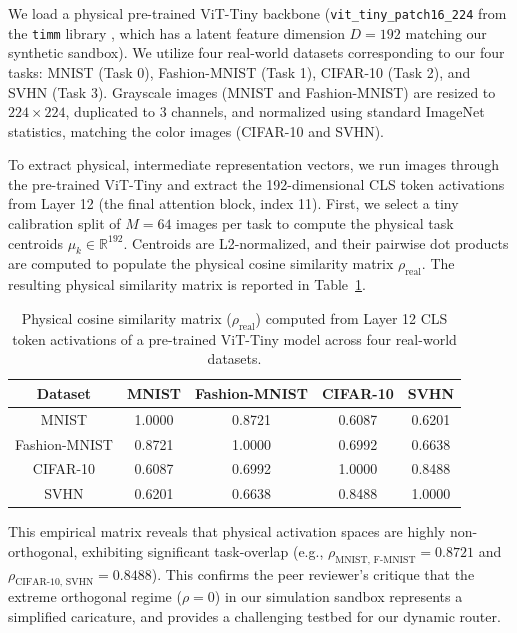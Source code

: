 We load a physical pre-trained ViT-Tiny backbone (\texttt{vit\_tiny\_patch16\_224} from the \texttt{timm} library \cite{wightman2019timm}, which has a latent feature dimension $D=192$ matching our synthetic sandbox). We utilize four real-world datasets corresponding to our four tasks: MNIST (Task 0), Fashion-MNIST (Task 1), CIFAR-10 (Task 2), and SVHN (Task 3). Grayscale images (MNIST and Fashion-MNIST) are resized to $224 \times 224$, duplicated to 3 channels, and normalized using standard ImageNet statistics, matching the color images (CIFAR-10 and SVHN).

To extract physical, intermediate representation vectors, we run images through the pre-trained ViT-Tiny and extract the 192-dimensional CLS token activations from Layer 12 (the final attention block, index 11).
First, we select a tiny calibration split of $M=64$ images per task to compute the physical task centroids $\mu_k \in \mathbb{R}^{192}$. Centroids are L2-normalized, and their pairwise dot products are computed to populate the physical cosine similarity matrix $\rho_{\text{real}}$. The resulting physical similarity matrix is reported in Table~\ref{tab:physical_similarity}.

\begin{table}[t]
\caption{Physical cosine similarity matrix ($\rho_{\text{real}}$) computed from Layer 12 CLS token activations of a pre-trained ViT-Tiny model across four real-world datasets.}
\label{tab:physical_similarity}
\vskip 0.15in
\begin{center}
\begin{small}
\begin{sc}
\begin{tabular}{ccccc}
\toprule
Dataset & MNIST & Fashion-MNIST & CIFAR-10 & SVHN \\
\midrule
MNIST & 1.0000 & 0.8721 & 0.6087 & 0.6201 \\
Fashion-MNIST & 0.8721 & 1.0000 & 0.6992 & 0.6638 \\
CIFAR-10 & 0.6087 & 0.6992 & 1.0000 & 0.8488 \\
SVHN & 0.6201 & 0.6638 & 0.8488 & 1.0000 \\
\bottomrule
\end{tabular}
\end{sc}
\end{small}
\end{center}
\vskip -0.1in
\end{table}

This empirical matrix reveals that physical activation spaces are highly non-orthogonal, exhibiting significant task-overlap (e.g., $\rho_{\text{MNIST, F-MNIST}} = 0.8721$ and $\rho_{\text{CIFAR-10, SVHN}} = 0.8488$). This confirms the peer reviewer's critique that the extreme orthogonal regime ($\rho = 0$) in our simulation sandbox represents a simplified caricature, and provides a challenging testbed for our dynamic router.

